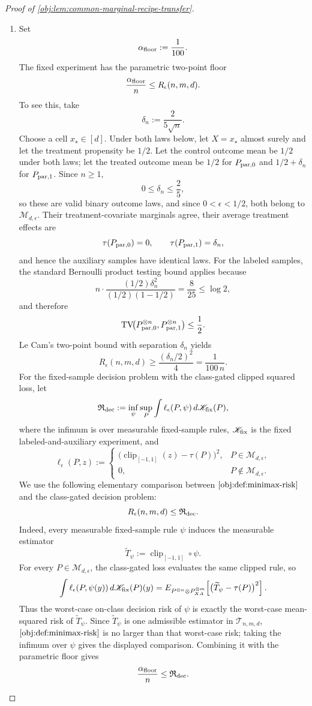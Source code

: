 \begin{proof}[Proof of \cref{obj:lem:common-marginal-recipe-transfer}]
\begin{enumerate}
\item Set
\[
\alpha_{\rm floor}:=\frac1{100}.
\]
The fixed experiment has the parametric two-point floor
\[
\frac{\alpha_{\rm floor}}{n}\le R_\epsilon(n,m,d).
\]
To see this, take
\[
\delta_n:=\frac{2}{5\sqrt n}.
\]
Choose a cell \(x_\star\in[d]\).  Under both laws below, let \(X=x_\star\) almost surely and let the treatment propensity be \(1/2\).  Let the control outcome mean be \(1/2\) under both laws; let the treated outcome mean be \(1/2\) for \(P_{\rm par,0}\) and \(1/2+\delta_n\) for \(P_{\rm par,1}\).  Since \(n\ge1\),
\[
0\le\delta_n\le\frac25,
\]
so these are valid binary outcome laws, and since \(0<\epsilon<1/2\), both belong to \(\mathcal M_{d,\epsilon}\).  Their treatment-covariate marginals agree, their average treatment effects are
\[
\tau(P_{\rm par,0})=0,
\qquad
\tau(P_{\rm par,1})=\delta_n,
\]
and hence the auxiliary samples have identical laws.  For the labeled samples, the standard Bernoulli product testing bound applies because
\[
n\cdot
\frac{(1/2)\delta_n^2}{(1/2)(1-1/2)}
=
\frac{8}{25}
\le \log 2,
\]
and therefore
\[
\operatorname{TV}\!\bigl(P_{\rm par,0}^{\otimes n},P_{\rm par,1}^{\otimes n}\bigr)
\le\frac12.
\]
Le Cam's two-point bound with separation \(\delta_n\) yields
\[
R_\epsilon(n,m,d)
\ge
\frac{(\delta_n/2)^2}{4}
=
\frac1{100\,n}.
\]
For the fixed-sample decision problem with the class-gated clipped squared loss, let
\[
\mathfrak R_{\rm dec}
:=
\inf_{\psi}
\sup_P
\int
\ell_\epsilon(P,\psi)\,d\mathscr K_{\rm fix}(P),
\]
where the infimum is over measurable fixed-sample rules, \(\mathscr K_{\rm fix}\) is the fixed labeled-and-auxiliary experiment, and
\[
\ell_\epsilon(P,z)
:=
\begin{cases}
\bigl(\operatorname{clip}_{[-1,1]}(z)-\tau(P)\bigr)^2,& P\in\mathcal M_{d,\epsilon},\\
0,& P\notin\mathcal M_{d,\epsilon}.
\end{cases}
\]
We use the following elementary comparison between \(\cref{obj:def:minimax-risk}\) and the class-gated decision problem:
\[
R_\epsilon(n,m,d)
\le
\mathfrak R_{\rm dec}.
\]
Indeed, every measurable fixed-sample rule \(\psi\) induces the measurable estimator
\[
\widetilde T_\psi:=\operatorname{clip}_{[-1,1]}\circ\psi .
\]
For every \(P\in\mathcal M_{d,\epsilon}\), the class-gated loss evaluates the same clipped rule, so
\[
\int \ell_\epsilon(P,\psi(y))\,d\mathscr K_{\rm fix}(P)(y)
=
E_{P^{\otimes n}\otimes P_{XA}^{\otimes m}}
\!\left[\bigl(\widetilde T_\psi-\tau(P)\bigr)^2\right].
\]
Thus the worst-case on-class decision risk of \(\psi\) is exactly the worst-case mean-squared risk of \(\widetilde T_\psi\).  Since \(\widetilde T_\psi\) is one admissible estimator in \(\mathcal T_{n,m,d}\), \(\cref{obj:def:minimax-risk}\) is no larger than that worst-case risk; taking the infimum over \(\psi\) gives the displayed comparison.  Combining it with the parametric floor gives
\[
\frac{\alpha_{\rm floor}}{n}
\le
\mathfrak R_{\rm dec}.
\] %


\end{enumerate}
\end{proof}
